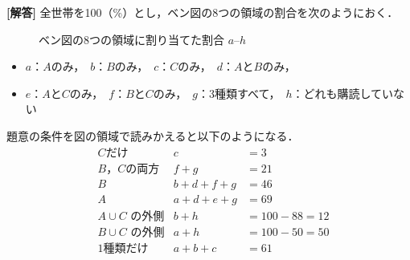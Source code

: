 \documentclass[../../main.tex]{subfiles}
\begin{document}
\begin{oframed}
  
\end{oframed}

{\bf [解答]}
全世帯を100（\%）とし，ベン図の8つの領域の割合を次のようにおく．

\begin{figure}[htb]
  \centering
  \caption{ベン図の8つの領域に割り当てた割合 $a$--$h$}
  \label{fig:venn_variables}
\end{figure}

\begin{itemize}
  \item[] $a$：$A$のみ，\ $b$：$B$のみ，\ $c$：$C$のみ，\ $d$：$A$と$B$のみ，
  \item[] $e$：$A$と$C$のみ，\ $f$：$B$と$C$のみ，\ $g$：3種類すべて，\ $h$：どれも購読していない
\end{itemize}

題意の条件を図の領域で読みかえると以下のようになる．
\begin{align}
  &\text{$C$だけ}                 & c &= 3 \label{eq:1}\\
  &\text{$B$，$C$の両方}          & f+g &= 21 \label{eq:2}\\
  &\text{$B$}                     & b+d+f+g &= 46 \label{eq:3}\\
  &\text{$A$}                     & a+d+e+g &= 69 \label{eq:4}\\
  &\text{$A\cup C$ の外側}        & b+h &= 100-88 = 12 \label{eq:5}\\
  &\text{$B\cup C$ の外側}        & a+h &= 100-50 = 50 \label{eq:6}\\
  &\text{1種類だけ}               & a+b+c &= 61 \label{eq:7}
\end{align}
\end{document}
